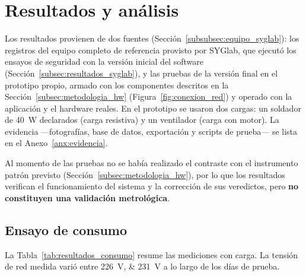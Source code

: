 \section{Resultados y análisis}
\label{sec:resultados}

Los resultados provienen de dos fuentes
(Sección~\ref{subsubsec:equipo_syglab}): los registros del equipo completo de
referencia provisto por SYGlab, que ejecutó los ensayos de seguridad con la
versión inicial del software (Sección~\ref{subsec:resultados_syglab}), y las pruebas de la versión
final en el prototipo propio, armado con los componentes descritos en la
Sección~\ref{subsec:metodologia_hw} (Figura~\ref{fig:conexion_red}) y operado
con la aplicación y el hardware reales.
En el prototipo se usaron dos cargas: un soldador de
\SI{40}{\watt} declarados (carga resistiva) y un ventilador (carga con motor). La
evidencia ---fotografías, base de datos, exportación y scripts de prueba--- se
lista en el Anexo~\ref{anx:evidencia}.

Al momento de las pruebas no se había realizado el contraste con el instrumento
patrón previsto (Sección~\ref{subsec:metodologia_hw}), por lo que los
resultados verifican el funcionamiento del sistema y la corrección de sus
veredictos, pero \textbf{no constituyen una validación metrológica}.

\subsection{Ensayo de consumo}
\label{subsec:resultados_consumo}

La Tabla~\ref{tab:resultados_consumo} resume las mediciones con carga. La tensión
de red medida varió entre \SIlist{226;231}{\volt} a lo largo de los días de
prueba.

